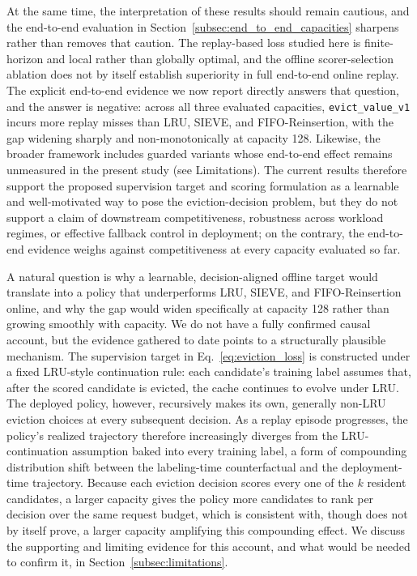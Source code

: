 \documentclass[preprint,12pt]{elsarticle}
\begin{document}
At the same time, the interpretation of these results should remain cautious, and the end-to-end evaluation in Section~\ref{subsec:end_to_end_capacities} sharpens rather than removes that caution. The replay-based loss studied here is finite-horizon and local rather than globally optimal, and the offline scorer-selection ablation does not by itself establish superiority in full end-to-end online replay. The explicit end-to-end evidence we now report directly answers that question, and the answer is negative: across all three evaluated capacities, \texttt{evict\_value\_v1} incurs more replay misses than LRU, SIEVE, and FIFO-Reinsertion, with the gap widening sharply and non-monotonically at capacity 128. Likewise, the broader framework includes guarded variants whose end-to-end effect remains unmeasured in the present study (see Limitations). The current results therefore support the proposed supervision target and scoring formulation as a learnable and well-motivated way to pose the eviction-decision problem, but they do not support a claim of downstream competitiveness, robustness across workload regimes, or effective fallback control in deployment; on the contrary, the end-to-end evidence weighs against competitiveness at every capacity evaluated so far.

A natural question is why a learnable, decision-aligned offline target would translate into a policy that underperforms LRU, SIEVE, and FIFO-Reinsertion online, and why the gap would widen specifically at capacity 128 rather than growing smoothly with capacity. We do not have a fully confirmed causal account, but the evidence gathered to date points to a structurally plausible mechanism. The supervision target in Eq.~\eqref{eq:eviction_loss} is constructed under a fixed LRU-style continuation rule: each candidate's training label assumes that, after the scored candidate is evicted, the cache continues to evolve under LRU. The deployed policy, however, recursively makes its own, generally non-LRU eviction choices at every subsequent decision. As a replay episode progresses, the policy's realized trajectory therefore increasingly diverges from the LRU-continuation assumption baked into every training label, a form of compounding distribution shift between the labeling-time counterfactual and the deployment-time trajectory. Because each eviction decision scores every one of the $k$ resident candidates, a larger capacity gives the policy more candidates to rank per decision over the same request budget, which is consistent with, though does not by itself prove, a larger capacity amplifying this compounding effect. We discuss the supporting and limiting evidence for this account, and what would be needed to confirm it, in Section~\ref{subsec:limitations}.
\end{document}
